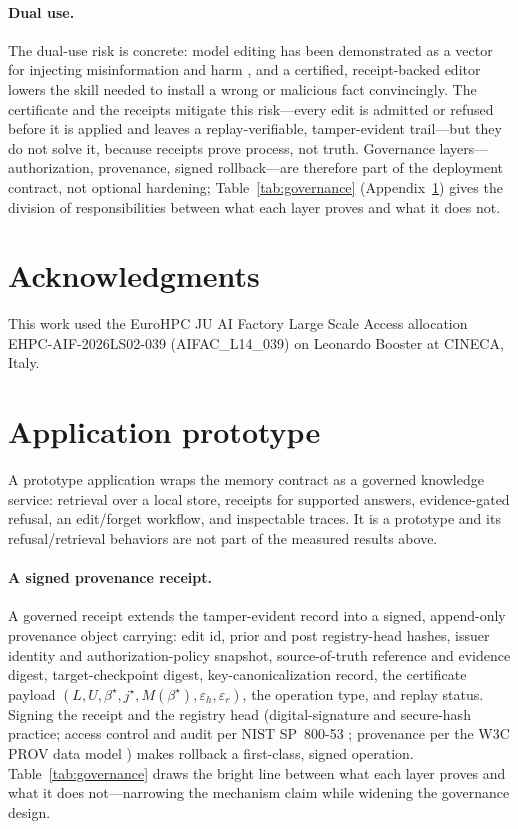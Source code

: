 \documentclass[10pt,twocolumn]{article}
\theoremstyle{remark}
\begin{document}
\paragraph{Dual use.} The dual-use risk is concrete: model editing has been
demonstrated as a vector for injecting misinformation and harm
\citep{chen2024injectharm}, and a certified, receipt-backed editor lowers the
skill needed to install a wrong or malicious fact convincingly. The certificate
and the receipts mitigate this risk---every edit is admitted or refused before
it is applied and leaves a replay-verifiable, tamper-evident trail---but they
do not solve it, because receipts prove process, not truth. Governance
layers---authorization, provenance, signed rollback---are therefore part of the
deployment contract, not optional hardening; Table~\ref{tab:governance}
(Appendix~\ref{app:prototype}) gives the division of responsibilities between what each layer
proves and what it does not.

\section*{Acknowledgments}
This work used the EuroHPC JU AI Factory Large Scale Access allocation
EHPC-AIF-2026LS02-039 (AIFAC\_L14\_039) on Leonardo Booster at CINECA, Italy.

\appendix
\section{Application prototype}\label{app:prototype}
A prototype application wraps the memory contract as a governed knowledge service:
retrieval over a local store, receipts for supported answers, evidence-gated
refusal, an edit/forget workflow, and inspectable traces. It is a prototype and
its refusal/retrieval behaviors are not part of the measured results above.

\paragraph{A signed provenance receipt.} A governed receipt extends the
tamper-evident record into a signed, append-only provenance object carrying: edit
id, prior and post registry-head hashes, issuer identity and authorization-policy
snapshot, source-of-truth reference and evidence digest, target-checkpoint digest,
key-canonicalization record, the certificate payload
$(L,U,\beta^{\star},j^{\star},M(\beta^{\star}),\varepsilon_h,\varepsilon_r)$, the
operation type, and replay status. Signing the receipt and the registry head
(digital-signature and secure-hash practice; access control and audit per NIST
SP~800-53 \citep{nist80053}; provenance per the W3C PROV data model
\citep{w3cprovdm}) makes rollback a first-class, signed operation.
Table~\ref{tab:governance} draws the bright line between what each layer proves and
what it does not---narrowing the mechanism claim while widening the governance
design.
\end{document}
